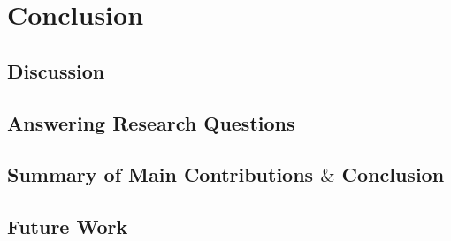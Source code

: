 \section{Conclusion}

\subsection{Discussion}

\subsection{Answering Research Questions}

\subsection{Summary of Main Contributions $\&$ Conclusion}

\subsection{Future Work}

